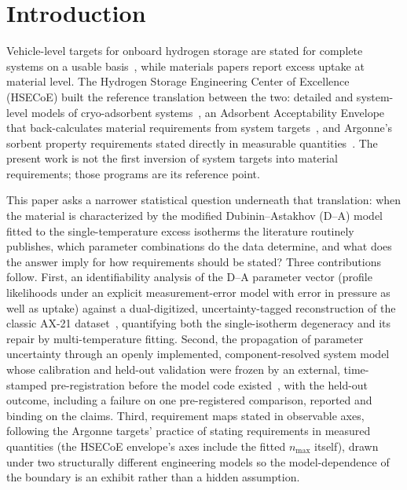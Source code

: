 \documentclass[preprint,12pt]{elsarticle}
\begin{document}
\section{Introduction}

Vehicle-level targets for onboard hydrogen storage are stated for complete
systems on a usable basis~\cite{usdrive2017}, while materials papers report
excess uptake at material level. The Hydrogen Storage Engineering Center of
Excellence (HSECoE) built the reference translation between the two: detailed
and system-level models of cryo-adsorbent
systems~\cite{hardy2012,tamburello2017,purewal2019}, an Adsorbent
Acceptability Envelope that back-calculates material requirements from system
targets~\cite{hardy2018,corgnale2012,pasini2013}, and Argonne's sorbent
property requirements stated
directly in measurable quantities~\cite{ahluwalia2015}. The present work is
not the first inversion of system targets into material requirements; those
programs are its reference point.

This paper asks a narrower statistical question underneath that translation:
when the material is characterized by the modified Dubinin--Astakhov
(D--A) model~\cite{richard2009a} fitted to the single-temperature excess isotherms
the literature routinely publishes, which parameter combinations do the
data determine, and what does the answer imply for how requirements should
be stated? Three contributions follow. First, an identifiability analysis
of the D--A parameter vector (profile likelihoods under an explicit
measurement-error model with error in pressure as well as uptake) against a
dual-digitized, uncertainty-tagged reconstruction of the classic AX-21
dataset~\cite{benard2001,richard2009a}, quantifying both the single-isotherm
degeneracy and its repair by multi-temperature fitting. Second, the
propagation of parameter uncertainty through an openly implemented,
component-resolved system model whose calibration and held-out validation
were frozen by an external, time-stamped pre-registration before the model
code existed~\cite{prereg}, with the held-out outcome, including a failure
on one pre-registered comparison, reported and binding on the claims. Third,
requirement maps stated in observable axes, following the Argonne targets'
practice of stating requirements in measured quantities (the HSECoE
envelope's axes include the fitted $n_{\max}$ itself), drawn under two
structurally different engineering models so the model-dependence of the
boundary is an exhibit rather than a hidden assumption.
\end{document}
